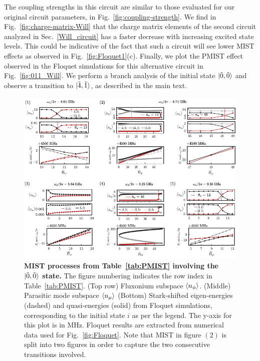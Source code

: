 \documentclass[%
reprint,
superscriptaddress,
 amsmath,amssymb,
 aps,
 prx,
longbibliography,
floatfix,
]{revtex4-2}
\begin{document}
{The coupling strengths in this circuit are similar to those evaluated for our original circuit parameters, in Fig.~\ref{fig:coupling-strength}. We find in Fig.~\ref{fig:charge-matrix-Will} that the charge matrix elements of the second circuit analyzed in Sec.~\ref{Will_circuit} has a faster decrease with increasing excited state levels. This could be indicative of the fact that such a circuit will see lower MIST effects as observed in Fig.~\ref{fig:Floquet1}(c). Finally, we plot the PMIST effect observed in the Floquet simulations for this alternative circuit in Fig.~\ref{fig:011_Will}. We perform a branch analysis of the initial state $\ket{\tilde{0}, \tilde{0}}$ and observe a transition to $\ket{\tilde{4},\tilde{1}}$, as described in the main text. 
\begin{figure}
    \centering
    \includegraphics[width=1.0\textwidth]{Supp_Fig/Trans0.pdf}
    \caption{\textbf{MIST processes from Table~\ref{tab:PMIST} involving the $\ket{\tilde{0},\tilde{0}}$ state.} The figure numbering indicates the row index in Table~\ref{tab:PMIST}. (Top row) Fluxonium subspace $\braket{n_\phi}$. (Middle) Parasitic mode subspace $\braket{n_\mu}$ (Bottom) Stark-shifted eigen-energies (dashed) and quasi-energies (solid) from Floquet simulations, corresponding to the initial state $i$ as per the legend. The y-axis for this plot is in MHz. Floquet results are extracted from numerical data used for Fig.~\ref{fig:Floquet}. Note that MIST in figure $(2)$ is split into two figures in order to capture the two consecutive transitions involved.}
    \label{fig:Trans0}
\end{figure}
\begin{figure}

\end{figure}}
\end{document}
